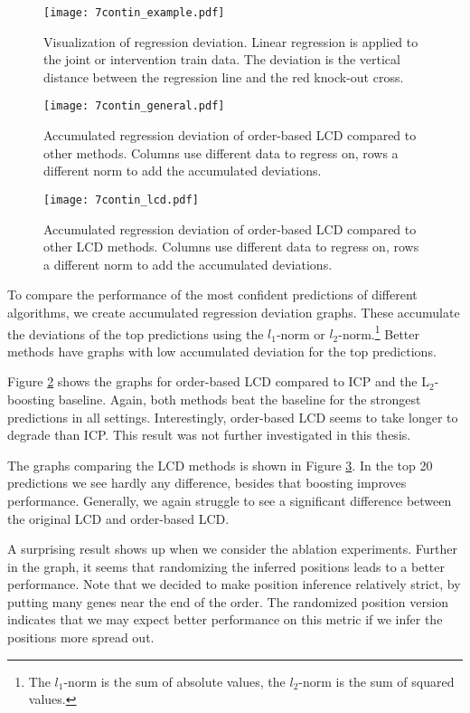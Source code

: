 \begin{figure}[h]
    \centering
    \texttt{[image: 7contin\_example.pdf]}
    \caption{Visualization of regression deviation. Linear regression is applied to the joint or intervention train data. The deviation is the vertical distance between the regression line and the red knock-out cross.}
    \label{fig:7:contex}
\end{figure}

\begin{figure}[p]
    \centering
    \texttt{[image: 7contin\_general.pdf]}
    \caption{Accumulated regression deviation of order-based LCD compared to other methods. Columns use different data to regress on, rows a different norm to add the accumulated deviations.}
    \label{fig:7:congen}
\end{figure}

\begin{figure}[p]
    \centering
    \texttt{[image: 7contin\_lcd.pdf]}
    \caption{Accumulated regression deviation of order-based LCD compared to other LCD methods. Columns use different data to regress on, rows a different norm to add the accumulated deviations.}
    \label{fig:7:conlcd}
\end{figure}

To compare the performance of the most confident predictions of different algorithms, we create accumulated regression deviation graphs. These accumulate the deviations of the top predictions using the $l_1$-norm or $l_2$-norm.\footnote{The $l_1$-norm is the sum of absolute values, the $l_2$-norm is the sum of squared values.} Better methods have graphs with low accumulated deviation for the top predictions.

Figure \ref{fig:7:congen} shows the graphs for order-based LCD compared to ICP and the L$_2$-boosting baseline. Again, both methods beat the baseline for the strongest predictions in all settings. Interestingly, order-based LCD seems to take longer to degrade than ICP. This result was not further investigated in this thesis.

The graphs comparing the LCD methods is shown in Figure \ref{fig:7:conlcd}. In the top 20 predictions we see hardly any difference, besides that boosting improves performance. Generally, we again struggle to see a significant difference between the original LCD and order-based LCD. 

A surprising result shows up when we consider the ablation experiments. Further in the graph, it seems that randomizing the inferred positions leads to a better performance. Note that we decided to make position inference relatively strict, by putting many genes near the end of the order. The randomized position version indicates that we may expect better performance on this metric if we infer the positions more spread out. 

